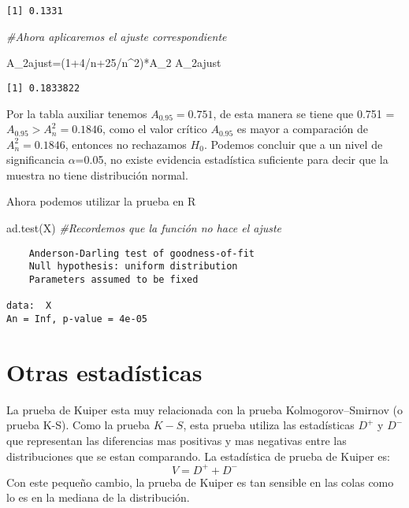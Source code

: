 \documentclass[
  a4paper,
  oneside,
  openany]{book}
\newenvironment{Shaded}{\begin{snugshade}}{\end{snugshade}}
\newcommand{\CommentTok}[1]{\textcolor[rgb]{0.56,0.35,0.01}{\textit{#1}}}
\newcommand{\DecValTok}[1]{\textcolor[rgb]{0.00,0.00,0.81}{#1}}
\newcommand{\FunctionTok}[1]{\textcolor[rgb]{0.00,0.00,0.00}{#1}}
\newcommand{\NormalTok}[1]{#1}
\newcommand{\OtherTok}[1]{\textcolor[rgb]{0.56,0.35,0.01}{#1}}
\newcommand{\SpecialCharTok}[1]{\textcolor[rgb]{0.00,0.00,0.00}{#1}}
\begin{document}
\begin{verbatim}
[1] 0.1331
\end{verbatim}

\begin{Shaded}
\begin{Highlighting}[]
\CommentTok{\#Ahora aplicaremos el ajuste correspondiente}

\NormalTok{A\_2ajust}\OtherTok{=}\NormalTok{(}\DecValTok{1}\SpecialCharTok{+}\DecValTok{4}\SpecialCharTok{/}\NormalTok{n}\SpecialCharTok{+}\DecValTok{25}\SpecialCharTok{/}\NormalTok{n}\SpecialCharTok{\^{}}\DecValTok{2}\NormalTok{)}\SpecialCharTok{*}\NormalTok{A\_2}
\NormalTok{A\_2ajust}
\end{Highlighting}
\end{Shaded}

\begin{verbatim}
[1] 0.1833822
\end{verbatim}

Por la tabla auxiliar tenemos \(A_{0.95}=0.751\), de esta manera se tiene que 0.751 = \(A_{0.95} > A_{n}^2=0.1846\), como el valor crítico \(A_{0.95}\) es mayor a comparación de \(A_{n}^2=0.1846\), entonces no rechazamos \(H_0\). Podemos concluir que a un nivel de significancia \(\alpha\)=0.05, no existe evidencia estadística suficiente para decir que la muestra no tiene distribución normal.

Ahora podemos utilizar la prueba en R

\begin{Shaded}
\begin{Highlighting}[]
\FunctionTok{ad.test}\NormalTok{(X)   }\CommentTok{\#Recordemos que la función no hace el ajuste}
\end{Highlighting}
\end{Shaded}

\begin{verbatim}
    Anderson-Darling test of goodness-of-fit
    Null hypothesis: uniform distribution
    Parameters assumed to be fixed

data:  X
An = Inf, p-value = 4e-05
\end{verbatim}

\hypertarget{otras-estaduxedsticas}{%
\chapter{Otras estadísticas}\label{otras-estaduxedsticas}}

La prueba de Kuiper esta muy relacionada con la prueba Kolmogorov--Smirnov (o prueba K-S). Como la prueba \(K-S\), esta prueba utiliza las estadísticas \(D^+\) y \(D^-\) que representan las diferencias mas positivas y mas negativas entre las distribuciones que se estan comparando. La estadística de prueba de Kuiper es:
\[V=D^+ + D^-\]
Con este pequeño cambio, la prueba de Kuiper es tan sensible en las colas como lo es en la mediana de la distribución.
\end{document}
